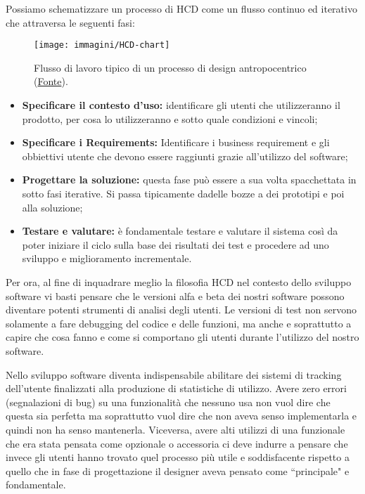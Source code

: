 Possiamo schematizzare un processo di HCD come un flusso continuo ed iterativo che attraversa le seguenti fasi:
\begin{figure}[!h]
	\centering
	\texttt{[image: immagini/HCD-chart]}
	\caption{Flusso di lavoro tipico di un processo di design antropocentrico
	(\href{https://www.usability.gov/what-and-why/user-centered-design.html}{Fonte}).}
\end{figure}
\begin{itemize}
	\itemsep-0.3em
    \item \textbf{Specificare il contesto d'uso:} identificare gli utenti che utilizzeranno il prodotto, per cosa lo utilizzeranno e sotto quale
	condizioni e vincoli;
    \item \textbf{Specificare i Requirements:} Identificare i business requirement e gli obbiettivi utente che devono essere raggiunti grazie all'utilizzo
	del software;
    \item \textbf{Progettare la soluzione:} questa fase può essere a sua volta spacchettata in sotto fasi iterative. Si passa tipicamente dadelle bozze
	a dei prototipi e poi alla soluzione;
    \item \textbf{Testare e valutare:} è fondamentale testare e valutare il sistema così da poter iniziare il ciclo sulla base dei risultati dei
	test e procedere ad uno sviluppo e miglioramento incrementale.
\end{itemize}

Per ora, al fine di inquadrare meglio la filosofia HCD nel contesto dello sviluppo software vi basti pensare che le versioni alfa e beta dei nostri
software possono diventare potenti strumenti di analisi degli utenti. Le versioni di test non servono solamente a fare debugging del codice e
delle funzioni, ma anche e soprattutto a capire che cosa fanno e come si comportano gli utenti durante l'utilizzo del nostro software.

Nello sviluppo software diventa indispensabile abilitare dei sistemi di tracking dell'utente finalizzati alla produzione di statistiche di
utilizzo. Avere zero errori (segnalazioni di bug) su una funzionalità che nessuno usa non vuol dire che questa sia perfetta ma soprattutto vuol dire
che non aveva senso implementarla e quindi non ha senso mantenerla. Viceversa, avere alti utilizzi di una funzionale che era stata pensata come opzionale
o accessoria ci deve indurre a pensare che invece gli utenti hanno trovato quel processo più utile e soddisfacente rispetto a quello che in fase di
progettazione il designer aveva pensato come ``principale" e fondamentale.

